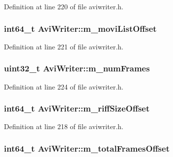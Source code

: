 Definition at line 220 of file aviwriter.\+h.

\hypertarget{struct_avi_writer_a60588df91bbc24906bd53d48e8d7d61e}{
\subsubsection[{m\+\_\+movi\+List\+Offset}]{\setlength{\rightskip}{0pt plus 5cm}int64\+\_\+t Avi\+Writer\+::m\+\_\+movi\+List\+Offset}}\label{struct_avi_writer_a60588df91bbc24906bd53d48e8d7d61e}


Definition at line 221 of file aviwriter.\+h.

\hypertarget{struct_avi_writer_a8d1109c12dc526429c7be6ffe4d047fc}{
\subsubsection[{m\+\_\+num\+Frames}]{\setlength{\rightskip}{0pt plus 5cm}uint32\+\_\+t Avi\+Writer\+::m\+\_\+num\+Frames}}\label{struct_avi_writer_a8d1109c12dc526429c7be6ffe4d047fc}


Definition at line 224 of file aviwriter.\+h.

\hypertarget{struct_avi_writer_a23e51510f0ea740ef05dfcf1aa1fcb43}{
\subsubsection[{m\+\_\+riff\+Size\+Offset}]{\setlength{\rightskip}{0pt plus 5cm}int64\+\_\+t Avi\+Writer\+::m\+\_\+riff\+Size\+Offset}}\label{struct_avi_writer_a23e51510f0ea740ef05dfcf1aa1fcb43}


Definition at line 218 of file aviwriter.\+h.

\hypertarget{struct_avi_writer_ac05959d6875e1de2f780e9f17889ee9c}{
\subsubsection[{m\+\_\+total\+Frames\+Offset}]{\setlength{\rightskip}{0pt plus 5cm}int64\+\_\+t Avi\+Writer\+::m\+\_\+total\+Frames\+Offset}}\label{struct_avi_writer_ac05959d6875e1de2f780e9f17889ee9c}



